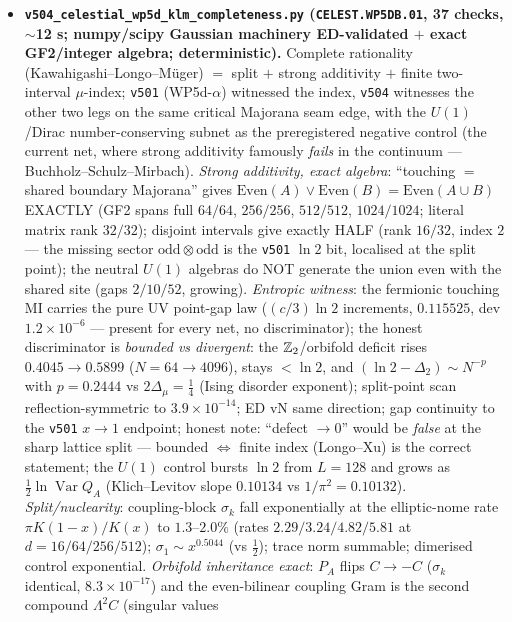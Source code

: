 \begin{itemize}[leftmargin=1.5em]
\item \textbf{\texttt{v504\_celestial\_wp5d\_klm\_completeness.py} (\texttt{CELEST.WP5DB.01}, 37
checks, $\sim$12 s; numpy/scipy Gaussian machinery ED-validated $+$ exact GF2/integer algebra;
deterministic).} Complete rationality (Kawahigashi--Longo--M\"uger) $=$ split $+$ strong additivity
$+$ finite two-interval $\mu$-index; \texttt{v501} (WP5d-$\alpha$) witnessed the index, \texttt{v504}
witnesses the other two legs on the same critical Majorana seam edge, with the $U(1)$/Dirac
number-conserving subnet as the preregistered negative control (the current net, where strong
additivity famously \emph{fails} in the continuum --- Buchholz--Schulz--Mirbach). \emph{Strong
additivity, exact algebra}: ``touching $=$ shared boundary Majorana'' gives
$\mathrm{Even}(A)\vee\mathrm{Even}(B)=\mathrm{Even}(A\cup B)$ EXACTLY (GF2 spans full $64/64$,
$256/256$, $512/512$, $1024/1024$; literal matrix rank $32/32$); disjoint intervals give exactly
HALF (rank $16/32$, index $2$ --- the missing sector $\mathrm{odd}\otimes\mathrm{odd}$ is the
\texttt{v501} $\ln2$ bit, localised at the split point); the neutral $U(1)$ algebras do NOT generate
the union even with the shared site (gaps $2/10/52$, growing). \emph{Entropic witness}: the
fermionic touching MI carries the pure UV point-gap law ($(c/3)\ln2$ increments, $0.115525$, dev
$1.2\times10^{-6}$ --- present for every net, no discriminator); the honest discriminator is
\emph{bounded vs divergent}: the $\mathbb{Z}_2$/orbifold deficit rises $0.4045\to0.5899$ ($N=64\to4096$),
stays $<\ln2$, and $(\ln2-\Delta_2)\sim N^{-p}$ with $p=0.2444$ vs $2\Delta_\mu=\tfrac14$ (Ising
disorder exponent); split-point scan reflection-symmetric to $3.9\times10^{-14}$; ED vN same
direction; gap continuity to the \texttt{v501} $x\to1$ endpoint; honest note: ``defect $\to0$''
would be \emph{false} at the sharp lattice split --- bounded $\Leftrightarrow$ finite index
(Longo--Xu) is the correct statement; the $U(1)$ control bursts $\ln2$ from $L=128$ and grows as
$\tfrac12\ln\operatorname{Var}Q_A$ (Klich--Levitov slope $0.10134$ vs $1/\pi^2=0.10132$).
\emph{Split/nuclearity}: coupling-block $\sigma_k$ fall exponentially at the elliptic-nome rate
$\pi K(1-x)/K(x)$ to $1.3$--$2.0\%$ (rates $2.29/3.24/4.82/5.81$ at $d=16/64/256/512$);
$\sigma_1\sim x^{0.5044}$ (vs $\tfrac12$); trace norm summable; dimerised control exponential.
\emph{Orbifold inheritance exact}: $P_A$ flips $C\to-C$ ($\sigma_k$ identical, $8.3\times10^{-17}$)
and the even-bilinear coupling Gram is the second compound $\Lambda^2C$ (singular values

\end{itemize}
